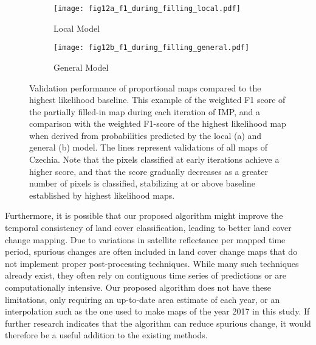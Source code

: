         \begin{figure}
            \vspace*{-4cm}
            \centering
            \begin{subfigure}[b]{0.82\textwidth}
            \centering
            \caption{Local Model}\texttt{[image: fig12a\_f1\_during\_filling\_local.pdf]}
            \label{fig:f1_filling_local}
            \hspace{-0.9em}
            
            \end{subfigure}
            
            \begin{subfigure}[b]{0.82\textwidth}
           \centering
           \caption{General Model}
           \texttt{[image: fig12b\_f1\_during\_filling\_general.pdf]}
           \label{fig:f1_filling_general}
           
        \end{subfigure}
            \vspace*{-0.75cm}
            \caption{Validation performance of proportional maps compared to the highest likelihood baseline. This example of the weighted F1 score of the partially filled-in map during each iteration of IMP, and a comparison with the weighted F1-score of the highest likelihood map when derived from probabilities predicted by the local (a) and general (b) model. The lines represent validations of all maps of Czechia. Note that the pixels classified at early iterations achieve a higher score, and that the score gradually decreases as a greater number of pixels is classified, stabilizing at or above baseline established by highest likelihood maps.}
            \label{fig:f1_score_during_filling}
        \end{figure}
    
        Furthermore, it is possible that our proposed algorithm might improve the temporal consistency of land cover classification, leading to better land cover change mapping. Due to variations in satellite reflectance per mapped time period, spurious changes are often included in land cover change maps that do not implement proper post-processing techniques. While many such techniques already exist, they often rely on contiguous time series of predictions or are computationally intensive. Our proposed algorithm does not have these limitations, only requiring an up-to-date area estimate of each year, or an interpolation such as the one used to make maps of the year 2017 in this study. If further research indicates that the algorithm can reduce spurious change, it would therefore be a useful addition to the existing methods.
        
